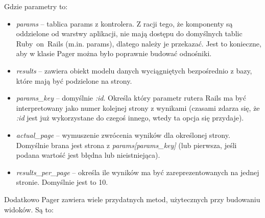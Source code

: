 \documentclass[a4paper,12pt,oneside]{report}
\begin{document}
Gdzie parametry to:
\begin{itemize}
  \item \emph{params} -- tablica params z kontrolera. Z racji tego, że komponenty są oddzielone od warstwy aplikacji, nie mają dostępu do domyślnych tablic Ruby~on~Rails (m.in. params), dlatego należy je przekazać. Jest to konieczne, aby w klasie Pager można było poprawnie budować odnośniki.
  \item \emph{results} -- zawiera obiekt modelu danych wyciągniętych bezpośrednio z bazy, które mają być podzielone na strony.
  \item \emph{params\_key} -- domyślnie \emph{:id}. Określa który parametr rutera Rails ma być interpretowany jako numer kolejnej strony z wynikami (czasami zdarza się, że \emph{:id} jest już wykorzystane do czegoś innego, wtedy ta opcja się przydaje).
  \item \emph{actual\_page} -- wymuszenie zwrócenia wyników dla określonej strony. Domyślnie brana jest strona z \emph{params[params\_key]} (lub pierwsza, jeśli podana wartość jest błędna lub nieistniejąca).
  \item \emph{results\_per\_page} -- określa ile wyników ma być zareprezentowanych na jednej stronie. Domyślnie jest to 10.
\end{itemize}
Dodatkowo Pager zawiera wiele przydatnych metod, użytecznych przy budowaniu widoków. Są to:
\end{document}
